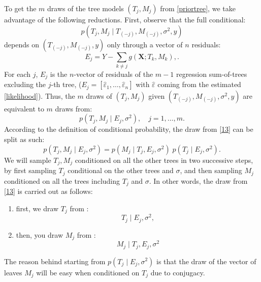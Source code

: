 \documentclass[a4paper,11pt]{article}
\begin{document}
To get the \( m \) draws of the tree models \( (T_j, M_j) \) from \eqref{priortree}, we take advantage of the following reductions. First, observe that the full conditional:
\[
p\left(T_j, M_j \mid T_{(-j)}, M_{(-j)}, \sigma^2, y\right)
\]
depends on \( (T_{(-j)}, M_{(-j)}, y) \) only through a vector of $n$ residuals:
\begin{equation}
E_j = Y - \sum_{k \neq j} g(\mathbf{X}; T_k, M_k), \label{residual}.
\end{equation}
For each $j$, $E_j$ is the $n$-vector of residuals of the $m-1$ regression sum-of-trees excluding the \( j \)-th tree, ($E_j = [\hat{\varepsilon}_1, \ldots, \hat{\varepsilon}_n]$ with $\hat{\varepsilon}$ coming from the estimated \eqref{likelihood}). Thus, the \( m \) draws of \( (T_j, M_j) \) given \( (T_{(-j)}, M_{(-j)}, \sigma^2, y) \) are equivalent to \( m \) draws from:
\begin{equation}
p(T_j, M_j \mid E_j, \sigma^2), \quad j = 1, \ldots, m. \label{13}
\end{equation}
According to the definition of conditional probability, the draw from \eqref{13} can be split as such:
\[
p(T_j, M_j \mid E_j, \sigma^2) = p(M_j \mid T_j, E_j, \sigma^2) \; p(T_j \mid E_j, \sigma^2).
\]
We will sample $T_j, M_j$ conditioned on all the other trees in two successive steps, by first sampling $T_j$ conditional on the other trees and $\sigma$, and then sampling $M_j$ conditioned on all the trees including $T_j$ and $\sigma$. In other words, the draw from \eqref{13} is carried out as follows:
\begin{enumerate}
    \item  first,  we draw  $T_j$ from :
\begin{equation}
 T_j \mid E_j, \sigma^2, \label{MH}
\end{equation}
\item then, you draw $M_j$ from :
\begin{equation}
M_j \mid T_j, E_j, \sigma^2 \label{drawM}
\end{equation}
\end{enumerate}
The reason behind starting from \( p(T_j \mid E_j, \sigma^2) \) is that the draw of the vector of leaves $M_j$ will be easy when conditioned on $T_j$ due to conjugacy. 
\end{document}
